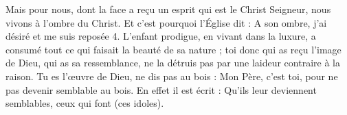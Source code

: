 Mais pour nous, dont la face a reçu un esprit qui est le Christ Seigneur, nous vivons à l’ombre du Christ. Et c’est pourquoi l’Église dit : A son ombre, j'ai désiré et me suis reposée 4. L’enfant prodigue, en vivant dans la luxure, a consumé tout ce qui faisait la beauté de sa nature ; toi donc qui as reçu l’image de Dieu, qui as sa ressemblance, ne la détruis pas par une laideur contraire à la raison. Tu es l’œuvre de Dieu, ne dis pas au bois : Mon Père, c’est toi, pour ne pas devenir semblable au bois. En effet il est écrit : Qu’ils leur deviennent semblables, ceux qui font (ces idoles).
